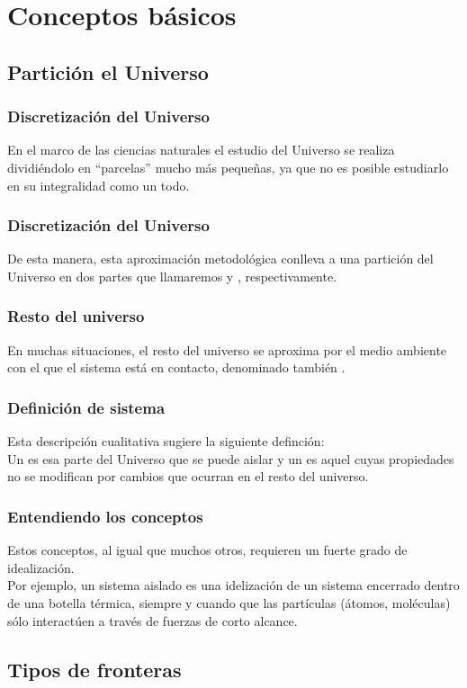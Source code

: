 \documentclass[12pt]{beamer}
\begin{document}
\section{Conceptos básicos}
\subsection{Partición el Universo}

\begin{frame}
\frametitle{Discretización del Universo}
En el marco de las ciencias naturales el estudio del Universo se realiza dividiéndolo en \enquote{parcelas} mucho más pequeñas, ya que no es posible estudiarlo en su integralidad como un todo.
\end{frame}
\begin{frame}
\frametitle{Discretización del Universo}    
De esta manera, esta aproximación metodológica conlleva a una partición del Universo en dos partes que llamaremos  \pause y , respectivamente.
\end{frame}
\begin{frame}
\frametitle{Resto del universo}
En muchas situaciones, el resto del universo se aproxima por el medio ambiente con el que el sistema está en contacto, denominado también .
\end{frame}
\begin{frame}
\frametitle{Definición de sistema}
Esta descripción cualitativa sugiere la siguiente definción:
\\
\bigskip
\pause
Un  es esa parte del Universo que se puede aislar \pause y un  es aquel cuyas propiedades no se modifican por cambios que ocurran en el resto del universo.
\end{frame}
\begin{frame}
\frametitle{Entendiendo los conceptos}
Estos conceptos, al igual que muchos otros, requieren un fuerte grado de idealización.
\\
\bigskip
\pause
Por ejemplo, un sistema aislado es una idelización de un sistema encerrado dentro de una botella térmica, siempre y cuando que las partículas (átomos, moléculas) sólo interactúen a través de fuerzas de corto alcance.
\end{frame}

\subsection{Tipos de fronteras}
\end{document}
